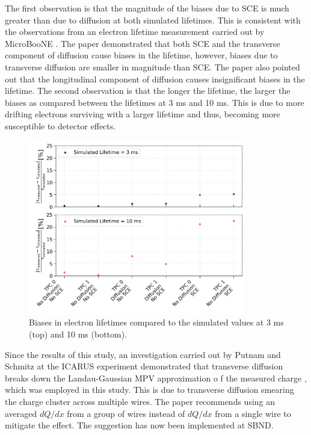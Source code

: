 The first observation is that the magnitude of the biases due to SCE is much greater than due to diffusion at both simulated lifetimes.
This is consistent with the observations from an electron lifetime measurement carried out by MicroBooNE \cite{ubooneEtime}. 
The paper demonstrated that both SCE and the transverse component of diffusion cause biases in the lifetime, however, biases due to transverse diffusion are smaller in magnitude than SCE.
The paper also pointed out that the longitudinal component of diffusion causes insignificant biases in the lifetime.
The second observation is that the longer the lifetime, the larger the biases as compared between the lifetimes at 3 ms and 10 ms.
This is due to more drifting electrons surviving with a larger lifetime and thus, becoming more susceptible to detector effects.

\begin{figure}[t!] 
\centering    
\includegraphics[width=0.85\textwidth]{etime_biases_compare}
\caption[Electron Lifetime Measurement Biases]{
Biases in electron lifetimes compared to the simulated values at 3 ms (top) and 10 ms (bottom).
}
\label{fig:etime_biases_compare}
\end{figure}

Since the results of this study, an investigation carried out by Putnam and Schmitz at the ICARUS experiment demonstrated that transverse diffusion breaks down the Landau-Gaussian MPV approximation o
f the measured charge \cite{GrayDiffusion}, which was employed in this study.
This is due to transverse diffusion smearing the charge cluster across multiple wires.
The paper recommends using an averaged $dQ/dx$ from a group of wires instead of $dQ/dx$ from a single wire to mitigate the effect.
The suggestion has now been implemented at SBND.

